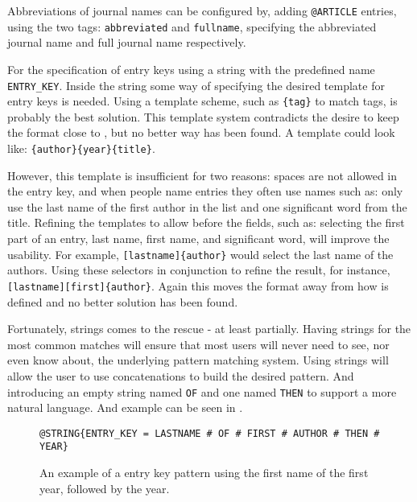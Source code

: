 Abbreviations of journal names can be configured by, adding
\texttt{@ARTICLE} entries, using the two tags: \texttt{abbreviated}
and \texttt{fullname}, specifying the abbreviated journal name and
full journal name respectively.


For the specification of entry keys using a {\bibtex} string with the
predefined name \texttt{ENTRY\_KEY}.  Inside the string some way of
specifying the desired template for entry keys is needed.  Using a
template scheme, such as \texttt{\{tag\}} to match tags, is probably
the best solution.  This template system contradicts the desire to
keep the format close to {\bibtex}, but no better way has been found.
A template could look like: \texttt{\{author\}\{year\}\{title\}}.

However, this template is insufficient for two reasons: spaces are not
allowed in the entry key, and when people name entries they often use
names such as: only use the last name of the first author in the list
and one significant word from the title.  Refining the templates to
allow  before the fields, such as: selecting the
first part of an entry, last name, first name, and significant word,
will improve the usability.  For example,
\texttt{[lastname]\{author\}} would select the last name of the
authors.  Using these selectors in conjunction to refine the result,
for instance, \texttt{[lastname][first]\{author\}}.  Again this moves
the format away from how {\bibtex} is defined and no better solution
has been found.

Fortunately, {\bibtex} strings comes to the rescue - at least
partially.  Having strings for the most common matches will ensure
that most users will never need to see, nor even know about, the
underlying pattern matching system.  Using strings will allow the user
to use concatenations to build the desired pattern.  And introducing
an empty string named \texttt{OF} and one named \texttt{THEN} to
support a more natural language.  And example can be seen in
.

\begin{figure}
  \centering
\begin{verbatim}
@STRING{ENTRY_KEY = LASTNAME # OF # FIRST # AUTHOR # THEN # YEAR}
\end{verbatim}
  \caption{An example of a entry key pattern using the first name of
    the first year, followed by the year.}
\label{fig:analyzing_entry_key_pattern}
\end{figure}

